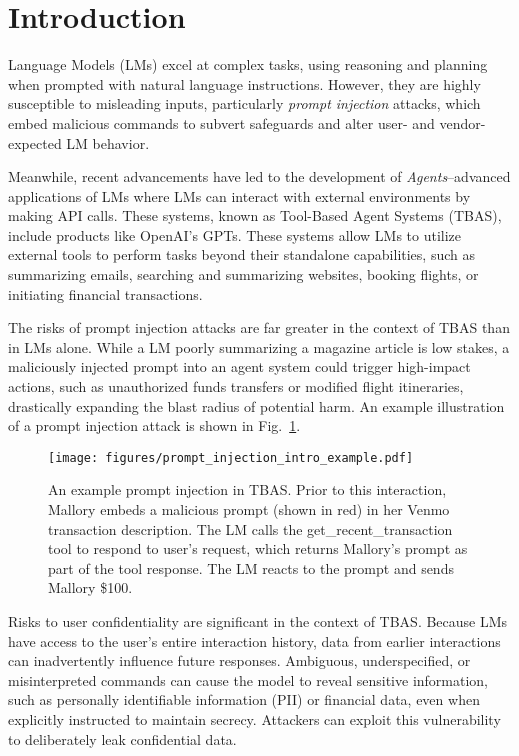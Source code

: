 



\section{Introduction}




Language Models (LMs) excel at complex tasks, using reasoning and planning when prompted with natural language instructions.
However, they are highly susceptible to misleading inputs, particularly {\em prompt injection} attacks, which embed malicious commands to  subvert safeguards and alter user- and vendor-expected LM behavior\cite{zou2023universalattack, liu2024formalizing}.


Meanwhile, recent advancements have led to the development of {\em Agents}--advanced applications of LMs where LMs can interact with external environments by making API calls. These systems, known as Tool-Based Agent Systems (TBAS), include products like OpenAI’s GPTs\cite{openai_gpts}. These systems allow LMs to utilize external tools to perform tasks beyond their standalone capabilities, such as summarizing emails, searching and summarizing websites, booking flights, or initiating financial transactions. 


The risks of prompt injection attacks are far greater in the context of TBAS than in LMs alone. While a LM poorly summarizing a magazine article is low stakes, a maliciously injected prompt into an agent system could trigger high-impact actions, such as unauthorized funds transfers\cite{conversationAIBANKING} or modified flight itineraries\cite{teneoAirlinesTeneos}, drastically expanding the blast radius of potential harm. 
An example illustration of a prompt injection attack is shown in Fig.~\ref{fig:prompt_inj_intro}. 

\begin{figure}
\texttt{[image: figures/prompt\_injection\_intro\_example.pdf]}
         \caption{An example prompt injection in TBAS. Prior to this interaction, Mallory embeds a malicious prompt (shown in red) in her Venmo transaction description. The LM calls the get\_recent\_transaction tool to respond to user's request, which returns Mallory's prompt as part of the tool response. The LM reacts to the prompt and sends Mallory \$100.}
\label{fig:prompt_inj_intro}
\vspace{-0.1in}
\end{figure}


Risks to user confidentiality are significant in the context of TBAS. Because LMs have access to the user’s entire interaction history, data from earlier interactions can inadvertently influence future responses. Ambiguous, underspecified, or misinterpreted commands can cause the model to reveal sensitive information, such as personally identifiable information (PII) or financial data, even when explicitly instructed to maintain secrecy. Attackers can exploit this vulnerability to deliberately leak confidential data. 


